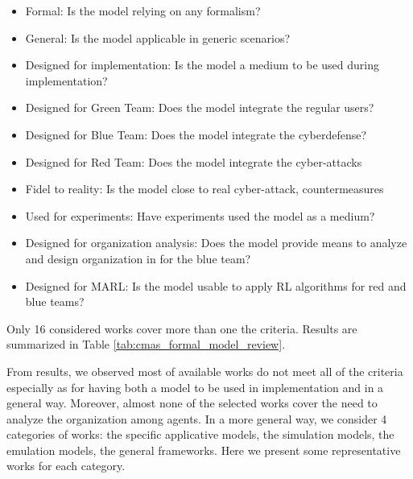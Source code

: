 \documentclass[conference]{IEEEtran}
\begin{document}
\begin{itemize}
    \item Formal: Is the model relying on any formalism? 
    \item General: Is the model applicable in generic scenarios?
    \item Designed for implementation: Is the model a medium to be used during implementation?
    \item Designed for Green Team: Does the model integrate the regular users?
    \item Designed for Blue Team: Does the model integrate the cyberdefense?
    \item Designed for Red Team: Does the model integrate the cyber-attacks
    \item Fidel to reality: Is the model close to real cyber-attack, countermeasures
    \item Used for experiments: Have experiments used the model as a medium?
    \item Designed for organization analysis: Does the model provide means to analyze and design organization in for the blue team?
    \item Designed for MARL: Is the model usable to apply RL algorithms for red and blue teams?
\end{itemize}

Only 16 considered works cover more than one the criteria. Results are summarized in Table \ref{tab:cmas_formal_model_review}.

From results, we observed most of available works do not meet all of the criteria especially as for having both a model to be used in implementation and in a general way. Moreover, almost none of the selected works cover the need to analyze the organization among agents. In a more general way, we consider 4 categories of works: the specific applicative models, the simulation models, the emulation models, the general frameworks. Here we present some representative works for each category.


\end{document}
